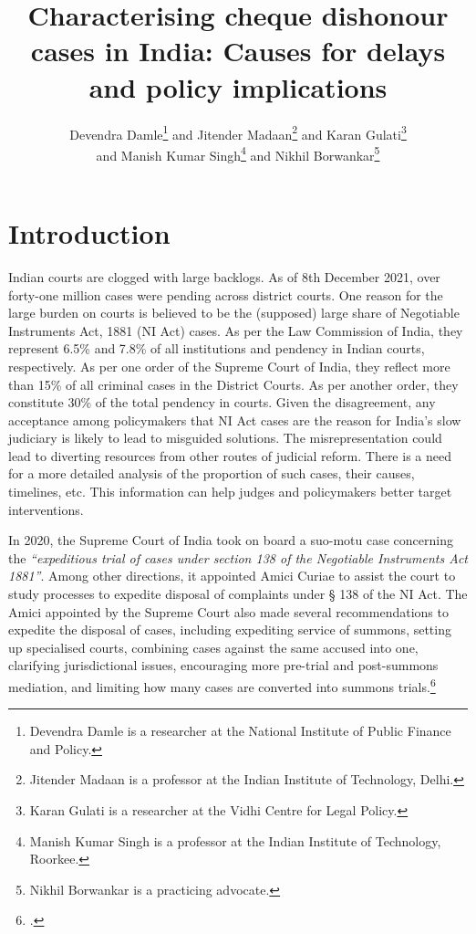 \documentclass[11pt,a4paper]{article}
\title{\vspace{-1.5cm}Characterising cheque dishonour cases in India: Causes for delays and policy implications}
\author{Devendra Damle\thanks{Devendra Damle is a researcher at the National Institute of Public Finance and Policy.} and Jitender Madaan\thanks{Jitender Madaan is a professor at the Indian Institute of Technology, Delhi.} and Karan Gulati\thanks{Karan Gulati is a researcher at the Vidhi Centre for Legal Policy.}\\ and Manish Kumar Singh\thanks{Manish Kumar Singh is a professor at the Indian Institute of Technology, Roorkee.} and Nikhil Borwankar\thanks{Nikhil Borwankar is a practicing advocate.}}
\date{\vspace{-1cm}}
\begin{document}
\maketitle

\section{Introduction}

Indian courts are clogged with large backlogs. As of 8th December 2021, over forty-one million cases were pending across district courts. One reason for the large burden on courts is believed to be the (supposed) large share of Negotiable Instruments Act, 1881 (NI Act) cases. As per the Law Commission of India, they represent 6.5\% and 7.8\% of all institutions and pendency in Indian courts, respectively. As per one order of the Supreme Court of India, they reflect more than 15\% of all criminal cases in the District Courts. As per another order, they constitute 30\% of the total pendency in courts. Given the disagreement, any acceptance among policymakers that NI Act cases are the reason for India’s slow judiciary is likely to lead to misguided solutions. The misrepresentation could lead to diverting resources from other routes of judicial reform. There is a need for a more detailed analysis of the proportion of such cases, their causes, timelines, etc. This information can help judges and policymakers better target interventions.

In 2020, the Supreme Court of India took on board a suo-motu case concerning the \emph{``expeditious trial of cases under section 138 of the Negotiable Instruments Act 1881''}. Among other directions, it appointed Amici Curiae to assist the court to study processes to expedite disposal of complaints under § 138 of the NI Act. The Amici appointed by the Supreme Court also made several recommendations to expedite the disposal of cases, including expediting service of summons, setting up specialised courts, combining cases against the same accused into one, clarifying jurisdictional issues, encouraging more pre-trial and post-summons mediation, and limiting how many cases are converted into summons trials.\footcite{amicus2020_submission}
\end{document}
